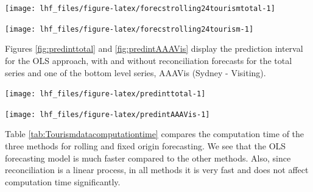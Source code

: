 \documentclass[11pt,a4paper,]{article}
\let\origfigure\figure
\let\endorigfigure\endfigure
\renewenvironment{figure}[1][2] {
    \expandafter\origfigure\expandafter[!htbp]
} {
    \endorigfigure
}
\begin{document}
\begin{figure}

{\centering \texttt{[image: lhf\_files/figure-latex/forecstrolling24tourismtotal-1]} 

}

\caption{Comparing ETS, ARIMA and OLS forecasts (reconciled and unreconciled) for 'Total' series. (Top: rolling origin, Bottom: fixed origin).}\label{fig:forecstrolling24tourismtotal}
\end{figure}

\begin{figure}

{\centering \texttt{[image: lhf\_files/figure-latex/forecstrolling24tourism-1]} 

}

\caption{Comparing ETS, ARIMA and OLS forecasts (reconciled and unreconciled) for 'AAAVis' bottom-level series. (Top: rolling origin, Bottom: fixed origin).}\label{fig:forecstrolling24tourism}
\end{figure}

Figures \ref{fig:predinttotal} and \ref{fig:predintAAAVis} display the prediction interval for the OLS approach, with and without reconciliation forecasts for the total series and one of the bottom level series, AAAVis (Sydney - Visiting).

\begin{figure}

{\centering \texttt{[image: lhf\_files/figure-latex/predinttotal-1]} 

}

\caption{Comparing ETS, ARIMA and OLS reconciled forecasts and prediction intervals for 'Total' series. (Top: rolling origin, Bottom: fixed origin).}\label{fig:predinttotal}
\end{figure}

\begin{figure}

{\centering \texttt{[image: lhf\_files/figure-latex/predintAAAVis-1]} 

}

\caption{Comparing ETS, ARIMA and OLS reconciled forecasts and prediction intervals for 'AAAVis' bottom-level series. (Top: rolling origin, Bottom: fixed origin).}\label{fig:predintAAAVis}
\end{figure}

Table \ref{tab:Tourismdatacomputationtime} compares the computation time of the three methods for rolling and fixed origin forecasting. We see that the OLS forecasting model is much faster compared to the other methods. Also, since reconciliation is a linear process, in all methods it is very fast and does not affect computation time significantly.
\end{document}
